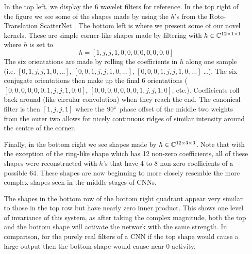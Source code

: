 In the top left, we display the 6 wavelet filters for reference. In the top
right of the figure we see some
of the shapes made by using the $h$'s from the Roto-Translation ScatterNet
\cite{sifre_rotation_2013, oyallon_deep_2015}.  The bottom left is where we
present some of our novel kernels. These are simple corner-like shapes made
by filtering with ${h\in \complexes[12\x 1\x 1]}$ where $h$ is set to
\begin{equation} \label{eq:ch4:simple_corner}
  h = [1, j, j, 1, 0, 0, 0, 0, 0, 0, 0, 0]
\end{equation}
The six orientations are made by rolling the coefficients in $h$ along one
sample (i.e. $[0, 1, j, j, 1, 0,\ldots]$, $[0,0,1,j,j,1,0,\ldots]$,
$[0,0,0,1,j,j,1,0, \ldots]$ \ldots). The six conjugate orientations then make up 
the final 6 orientations ($[0,0,0,0,0,0,1,j,j,1,0,0]$, $[0,0,0,0,0,0,0,1,j,j,1,0]$,
etc.). Coefficients roll back around (like circular convolution) when they reach the end. 
The canonical filter is then $[1, j, j, 1]$ where the $90\degs$ phase offset of the 
middle two weights from the outer two allows for nicely continuous ridges of 
similar intensity around the centre of the corner.

Finally, in the bottom right we see shapes made by
${h \in \complexes[12\x 3\x 3]}$. Note that with the exception of the
ring-like shape which has 12 non-zero coefficients, all of these shapes were
reconstructed with $h$'s that have 4 to 8 non-zero coefficients of a possible
64. These shapes are now beginning to more closely resemble the more complex
shapes seen in the middle stages of CNNs.

The shapes in the bottom row of the bottom right quadrant appear very similar to
those in the top row but have nearly zero inner product. This shows one level of
invariance of this system, as after taking the complex magnitude, both the top
and the bottom shape will activate the network with the same strength. In
comparison, for the purely real filters of a CNN if the top shape would cause a
large output then the bottom shape would cause near 0 activity.

